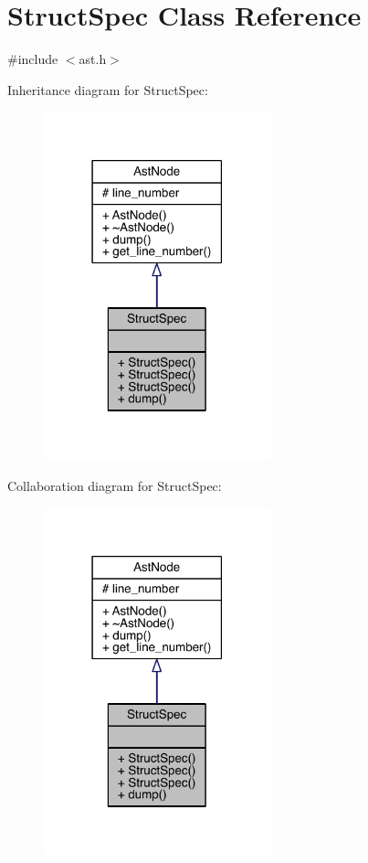 \hypertarget{class_struct_spec}{}\section{Struct\+Spec Class Reference}
\label{class_struct_spec}


{\ttfamily \#include $<$ast.\+h$>$}



Inheritance diagram for Struct\+Spec\+:\nopagebreak
\begin{figure}[H]
\begin{center}
\leavevmode
\includegraphics[width=186pt]{class_struct_spec__inherit__graph}
\end{center}
\end{figure}


Collaboration diagram for Struct\+Spec\+:\nopagebreak
\begin{figure}[H]
\begin{center}
\leavevmode
\includegraphics[width=186pt]{class_struct_spec__coll__graph}
\end{center}
\end{figure}
